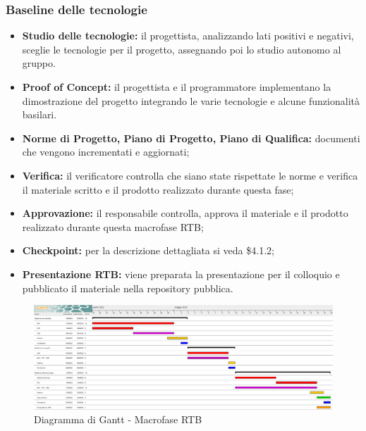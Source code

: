 \subsubsection{Baseline delle tecnologie}
\begin{itemize}
    \item \textbf{Studio delle tecnologie:} il progettista, analizzando lati positivi e negativi, sceglie le tecnologie per il progetto, assegnando poi lo studio autonomo al gruppo.
    \item \textbf{Proof of Concept:} il progettista e il programmatore implementano la dimostrazione del progetto integrando le varie tecnologie e alcune funzionalità basilari.
    \item \textbf{Norme di Progetto, Piano di Progetto, Piano di Qualifica:} documenti che vengono incrementati e aggiornati;
    \item \textbf{Verifica:} il verificatore controlla che siano state rispettate le norme e verifica il materiale scritto e il prodotto realizzato durante questa fase;
    \item \textbf{Approvazione:} il responsabile controlla, approva il materiale e il prodotto realizzato durante questa macrofase RTB;
    \item \textbf{Checkpoint:} per la descrizione dettagliata si veda \$4.1.2;
    \item \textbf{Presentazione RTB:} viene preparata la presentazione per il colloquio e pubblicato il materiale nella repository pubblica.
\end{itemize}


\begin{landscape}
	\begin{figure}
	\includegraphics[width=\linewidth]{images/RTB.png}
    \caption{Diagramma di Gantt - Macrofase RTB}
	\end{figure}
\end{landscape}